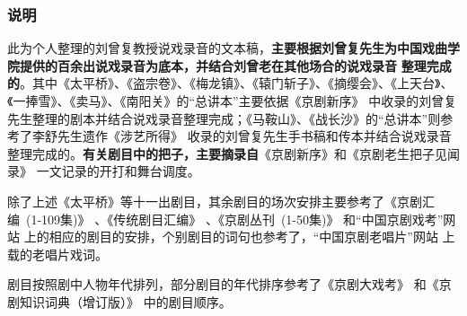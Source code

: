 \newpage
\setcounter{page}{0}
\hypertarget{ux8bf4-ux660e}{
	\subsubsection{\hei \large 说\hspace{35pt}明}\label{ux8bf4-ux660e}}
\pagestyle{fancy}    %

	此为个人整理的刘曾复教授说戏录音的文本稿，\textbf{主要根据刘曾复先生为中国戏曲学院提供的百余出说戏录音为底本，并结合刘曾老在其他场合的说戏录音}%
\textbf{整理完成的}。其中《太平桥》、《盗宗卷》、《梅龙镇》、《辕门斩子》、《摘缨会》、《上天台》、《一捧雪》、《卖马》、《南阳关》的``总讲本''主要依据《京剧新序》%
中收录的刘曾复先生整理的剧本并结合说戏录音整理完成；《马鞍山》、《战长沙》的``总讲本''则参考了李舒先生遗作《涉艺所得》%
收录的刘曾复先生手书稿和传本并结合说戏录音整理完成的。\textbf{有关剧目中的把子，主要摘录自}《京剧新序》和《京剧老生把子见闻录》%
一文记录的开打和舞台调度。

除了上述《太平桥》等十一出剧目，其余剧目的场次安排主要参考了《京剧汇编~(1-109集)》%
、《传统剧目汇编》%
、《京剧丛刊~(1-50集)》%
和``中国京剧戏考''网站%
上的相应的剧目的安排，个别剧目的词句也参考了，``中国京剧老唱片''网站%
上载的老唱片戏词。

剧目按照剧中人物年代排列，部分剧目的年代排序参考了《京剧大戏考》%
和《京剧知识词典（增订版）》%
中的剧目顺序。

